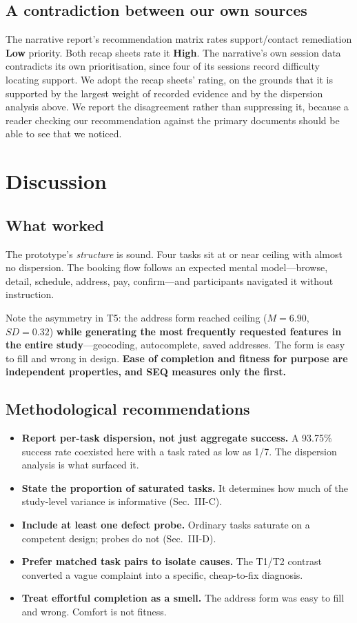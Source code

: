 \documentclass[conference]{IEEEtran}
\begin{document}
\subsection{A contradiction between our own sources}

The narrative report's recommendation matrix rates support/contact remediation
\textbf{Low} priority. Both recap sheets rate it \textbf{High}. The narrative's
own session data contradicts its own prioritisation, since four of its sessions
record difficulty locating support. We adopt the recap sheets' rating, on the
grounds that it is supported by the largest weight of recorded evidence and by
the dispersion analysis above. We report the disagreement rather than
suppressing it, because a reader checking our recommendation against the
primary documents should be able to see that we noticed.

\section{Discussion}

\subsection{What worked}

The prototype's \emph{structure} is sound. Four tasks sit at or near ceiling
with almost no dispersion. The booking flow follows an expected mental
model---browse, detail, schedule, address, pay, confirm---and participants
navigated it without instruction.

Note the asymmetry in T5: the address form reached ceiling ($M=6.90$,
$SD=0.32$) \textbf{while generating the most frequently requested features in
the entire study}---geocoding, autocomplete, saved addresses. The form is easy
to fill and wrong in design. \textbf{Ease of completion and fitness for purpose
are independent properties, and SEQ measures only the first.}

\subsection{Methodological recommendations}

\begin{itemize}
\item \textbf{Report per-task dispersion, not just aggregate success.} A
93.75\% success rate coexisted here with a task rated as low as 1/7. The
dispersion analysis is what surfaced it.
\item \textbf{State the proportion of saturated tasks.} It determines how much
of the study-level variance is informative (Sec.~III-C).
\item \textbf{Include at least one defect probe.} Ordinary tasks saturate on a
competent design; probes do not (Sec.~III-D).
\item \textbf{Prefer matched task pairs to isolate causes.} The T1/T2 contrast
converted a vague complaint into a specific, cheap-to-fix diagnosis.
\item \textbf{Treat effortful completion as a smell.} The address form was easy
to fill and wrong. Comfort is not fitness.
\end{itemize}
\end{document}
